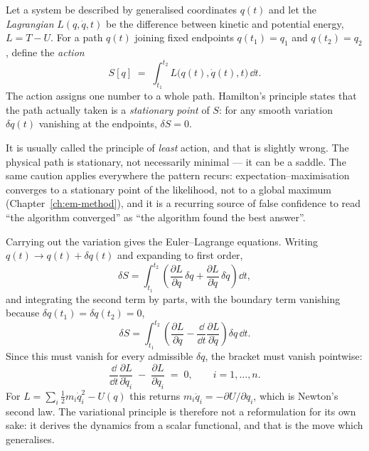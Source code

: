 Let a system be described by generalised coordinates $q(t)$ and let the
\emph{Lagrangian} $L(q, \dot q, t)$ be the difference between kinetic and
potential energy, $L = T - U$. For a path $q(t)$ joining fixed endpoints
$q(t_1) = q_1$ and $q(t_2) = q_2$, define the \emph{action}
\begin{equation}
  S[q] \;=\; \int_{t_1}^{t_2} L\big(q(t), \dot q(t), t\big)\,\dd t .
  \label{eq:action}
\end{equation}
The action assigns one number to a whole path. Hamilton's principle states
that the path actually taken is a \emph{stationary point} of $S$: for any
smooth variation $\delta q(t)$ vanishing at the endpoints,
$\delta S = 0$.

\begin{remark}
It is usually called the principle of \emph{least} action, and that is
slightly wrong. The physical path is stationary, not necessarily minimal ---
it can be a saddle. The same caution applies everywhere the pattern recurs:
expectation--maximisation converges to a stationary point of the likelihood,
not to a global maximum (Chapter~\ref{ch:em-method}), and it is a recurring
source of false confidence to read ``the algorithm converged'' as ``the
algorithm found the best answer''.
\end{remark}

Carrying out the variation gives the Euler--Lagrange equations. Writing
$q(t) \to q(t) + \delta q(t)$ and expanding to first order,
\[
  \delta S = \int_{t_1}^{t_2}
  \left(\frac{\partial L}{\partial q}\,\delta q
      + \frac{\partial L}{\partial \dot q}\,\delta \dot q\right)\dd t ,
\]
and integrating the second term by parts, with the boundary term vanishing
because $\delta q(t_1) = \delta q(t_2) = 0$,
\[
  \delta S = \int_{t_1}^{t_2}
  \left(\frac{\partial L}{\partial q}
      - \frac{\dd}{\dd t}\frac{\partial L}{\partial \dot q}\right)\delta q \,\dd t .
\]
Since this must vanish for every admissible $\delta q$, the bracket must
vanish pointwise:
\begin{equation}
  \frac{\dd}{\dd t}\frac{\partial L}{\partial \dot q_i}
  \;-\; \frac{\partial L}{\partial q_i} \;=\; 0,
  \qquad i = 1, \dots, n.
  \label{eq:euler-lagrange}
\end{equation}
For $L = \sum_i \tfrac12 m_i \dot q_i^2 - U(q)$ this returns
$m_i \ddot q_i = -\partial U/\partial q_i$, which is Newton's second law. The
variational principle is therefore not a reformulation for its own sake: it
derives the dynamics from a scalar functional, and that is the move which
generalises.

